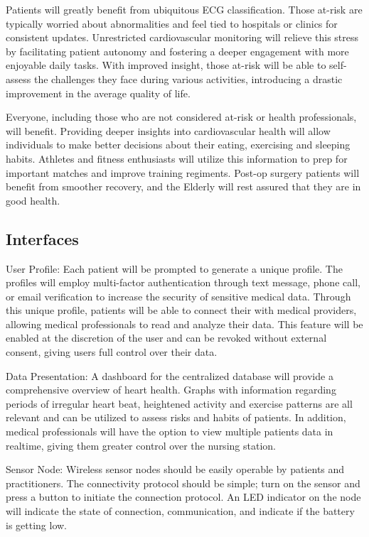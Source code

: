 \documentclass{article}
\begin{document}
Patients will greatly benefit from ubiquitous ECG classification. Those at-risk are typically worried about abnormalities and feel tied to hospitals or clinics for consistent updates. Unrestricted cardiovascular monitoring will relieve this stress by facilitating patient autonomy and fostering a deeper engagement with more enjoyable daily tasks. With improved insight, those at-risk will be able to self-assess the challenges they face during various activities, introducing a drastic improvement in the average quality of life. 

Everyone, including those who are not considered at-risk or health professionals, will benefit. Providing deeper insights into cardiovascular health will allow individuals to make better decisions about their eating, exercising and sleeping habits. Athletes and fitness enthusiasts will utilize this information to prep for important matches and improve training regiments. Post-op surgery patients will benefit from smoother recovery, and the Elderly will rest assured that they are in good health.
\subsection{Interfaces}
User Profile: Each patient will be prompted to generate a unique profile. The profiles will employ multi-factor authentication through text message, phone call, or email verification to increase the security of sensitive medical data. Through this unique profile, patients will be able to connect their with medical providers, allowing medical professionals to read and analyze their data. This feature will be enabled at the discretion of the user and can be revoked without external consent, giving users full control over their data.

Data Presentation: A dashboard for the centralized database will provide a comprehensive overview of heart health. Graphs with information regarding periods of irregular heart beat, heightened activity and exercise patterns are all relevant and can be utilized to assess risks and habits of patients. In addition, medical professionals will have the option to view multiple patients data in realtime, giving them greater control over the nursing station.

Sensor Node: Wireless sensor nodes should be easily operable by patients and practitioners. The connectivity protocol should be simple; turn on the sensor and press a button to initiate the connection protocol. An LED indicator on the node will indicate the state of connection, communication, and indicate if the battery is getting low.
\end{document}
